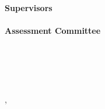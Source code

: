 \AddToShipoutPicture*{\TitleWatermark} %
{
	\small
	\textbf{Supervisors} \\
	\thesisSupervisor \\[1.5em]
	\textbf{Assessment Committee}\\
	\thesisAssessment \\[1.5em]
    \vfill
	\textbf{\thesisUniversity} \\
	\textit{\thesisFaculty} \\
	\thesisDepartment \\
	\thesisSection \\
	\thesisAddress,  \thesisPostal\ \thesisCity \\
	\thesisCountry \\[1.5em]
    \thesisVersion %
}
